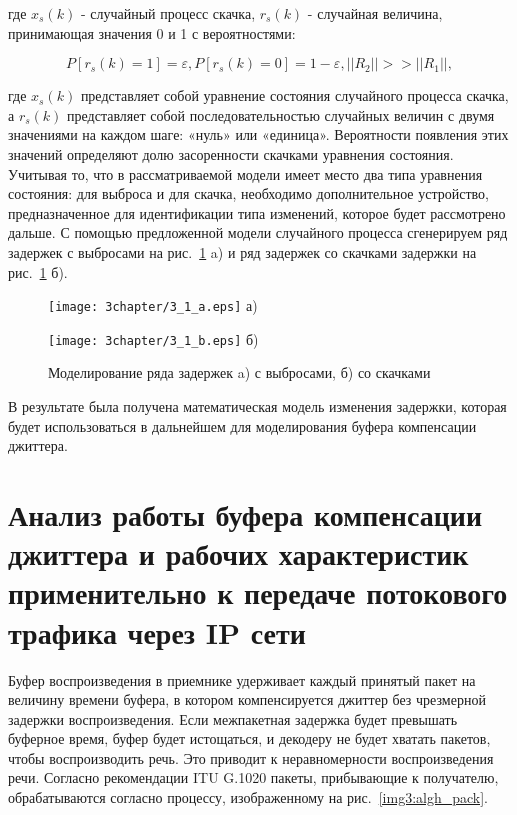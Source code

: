\noindent где $x_s(k)$ - случайный процесс скачка, $r_s(k)$ - случайная величина, принимающая значения 0 и 1 с вероятностями:

\begin{equation}\label{eq3:spp}
P[r_s(k)=1]=\varepsilon, P[r_s(k)=0]=1-\varepsilon, ||R_2||>>||R_1||,
\end{equation}

\noindent где $x_s(k)$ представляет собой уравнение состояния случайного процесса скачка, а $r_s(k)$ представляет собой последовательностью случайных величин с двумя значениями на каждом шаге: «нуль» или «единица». Вероятности появления этих значений определяют долю засоренности скачками уравнения состояния. 
Учитывая то, что в рассматриваемой модели имеет место два типа уравнения состояния: для выброса и для скачка, необходимо дополнительное устройство, предназначенное для идентификации типа изменений, которое будет рассмотрено дальше.
С помощью предложенной модели случайного процесса сгенерируем ряд задержек с выбросами на рис. \ref{img3:modelJitter} a) и ряд задержек со скачками задержки на рис. \ref{img3:modelJitter} б).

\begin{figure} [h]
\begin{minipage}[h]{0.47\linewidth}
\center
\texttt{[image: 3chapter/3\_1\_a.eps]} а) \\
\end{minipage}
\hfill
\begin{minipage}[h]{0.47\linewidth}
\center
\texttt{[image: 3chapter/3\_1\_b.eps]} б) \\
\end{minipage}
\caption{Моделирование ряда задержек a) с выбросами, б) со скачками}
\label{img3:modelJitter}
\end{figure}

В результате была получена математическая модель изменения задержки, которая будет использоваться в дальнейшем для моделирования буфера компенсации джиттера.

\section{Анализ работы буфера компенсации джиттера и рабочих характеристик применительно к передаче потокового трафика через IP сети} \label{sect3_2}

Буфер воспроизведения в приемнике удерживает каждый принятый пакет на величину времени буфера, в котором компенсируется джиттер без чрезмерной задержки воспроизведения. Если межпакетная задержка будет превышать буферное время, буфер будет истощаться, и декодеру не будет хватать пакетов, чтобы воспроизводить речь. Это приводит к неравномерности воспроизведения речи. 
Согласно рекомендации ITU G.1020 \cite{G1020} пакеты, прибывающие к получателю, обрабатываются согласно процессу, изображенному на рис. \ref{img3:algh_pack}.

